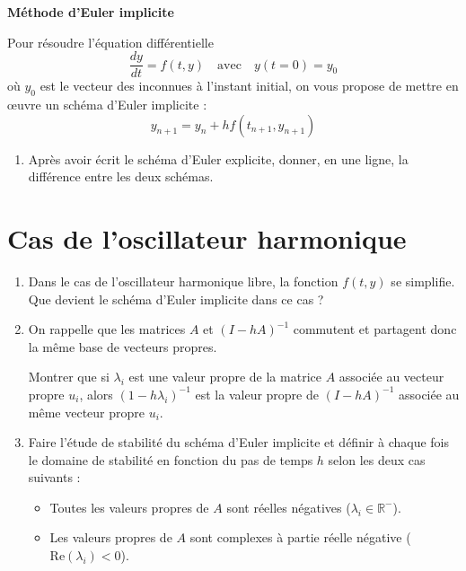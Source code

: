 \documentclass[a4paper, 12pt]{article}
\begin{document}
\lhead{} 
\chead{} 

\begin{center}
    \LARGE \bfseries Méthode d'Euler implicite
\end{center}
\vspace{0.5cm}

Pour résoudre l'équation différentielle 
\[
\frac{dy}{dt} = f(t, y) \quad \text{avec} \quad y(t=0)=y_0
\]
où $y_0$ est le vecteur des inconnues à l'instant initial, on vous propose de mettre en œuvre un schéma d'Euler implicite :
\[
y_{n+1} = y_{n} + h f(t_{n+1}, y_{n+1})
\]

\begin{enumerate}
    \item Après avoir écrit le schéma d'Euler explicite, donner, en une ligne, la différence entre les deux schémas.
        
\end{enumerate}

\section{Cas de l'oscillateur harmonique}

\begin{enumerate}[resume]
    \item Dans le cas de l'oscillateur harmonique libre, la fonction $f(t,y)$ se simplifie. Que devient le schéma d'Euler implicite dans ce cas ?

    \item On rappelle que les matrices $A$ et $(I-hA)^{-1}$ commutent et partagent donc la même base de vecteurs propres.
    
    Montrer que si $\lambda_i$ est une valeur propre de la matrice $A$ associée au vecteur propre $u_i$, alors $(1-h \lambda_i)^{-1}$ est la valeur propre de $(I-hA)^{-1}$ associée au même vecteur propre $u_i$.

    \item Faire l'étude de stabilité du schéma d'Euler implicite et définir à chaque fois le domaine de stabilité en fonction du pas de temps $h$ selon les deux cas suivants :
    \begin{itemize}
        \item Toutes les valeurs propres de $A$ sont réelles négatives ($\lambda_i \in \mathbb{R}^-$).
        \item Les valeurs propres de $A$ sont complexes à partie réelle négative ($\text{Re}(\lambda_i) < 0$).
    \end{itemize}
        
\end{enumerate}
\end{document}
